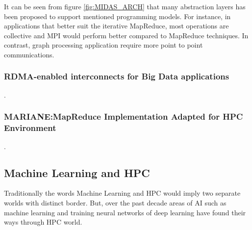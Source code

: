 \documentclass[runningheads,a4paper]{llncs}
\begin{document}
It can be seen from figure \ref{fig:MIDAS_ARCH} that many abstraction layers has been proposed to support mentioned programming models. For instance, in applications that better suit the iterative MapReduce, most operations are collective and MPI would perform better compared to MapReduce techniques. In contrast, graph processing application require more point to point communications.\\
%
%

\newpage
\subsubsection{RDMA-enabled interconnects for Big Data applications}.
\\
\lipsum[1]

\subsubsection{MARIANE:MapReduce Implementation Adapted for HPC Environment}.
\\
\lipsum[1]
\newpage
\subsection{Machine Learning and HPC}
Traditionally the words Machine Learning and HPC would imply two separate worlds with distinct border. But, over the past decade areas of AI such as machine learning and training neural networks of deep learning have found their ways through HPC world.\\
\end{document}
